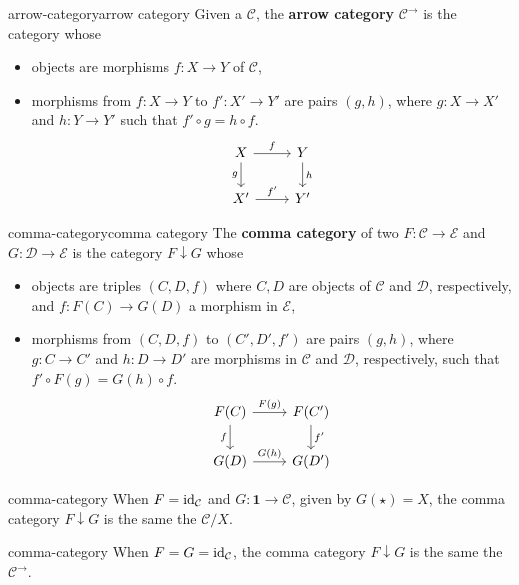 \begin{topic}{arrow-category}{arrow category}
    Given a  $\mathcal{C}$, the \textbf{arrow category} $\mathcal{C}^\rightarrow$ is the category whose
    \begin{itemize}
        \item objects are morphisms $f : X \to Y$ of $\mathcal{C}$,
        \item morphisms from $f : X \to Y$ to $f' : X' \to Y'$ are pairs $(g, h)$, where $g : X \to X'$ and $h : Y \to Y'$ such that $f' \circ g = h \circ f$.
        \[ \begin{tikzcd} X \arrow{r}{f} \arrow[swap]{d}{g} & Y \arrow{d}{h} \\ X' \arrow{r}{f'} & Y' \end{tikzcd} \]
    \end{itemize}
\end{topic}

\begin{topic}{comma-category}{comma category}
    The \textbf{comma category} of two  $F : \mathcal{C} \to \mathcal{E}$ and $G : \mathcal{D} \to \mathcal{E}$ is the category $F \downarrow G$ whose
    \begin{itemize}
        \item objects are triples $(C, D, f)$ where $C, D$ are objects of $\mathcal{C}$ and $\mathcal{D}$, respectively, and $f : F(C) \to G(D)$ a morphism in $\mathcal{E}$,
        \item morphisms from $(C, D, f)$ to $(C', D', f')$ are pairs $(g, h)$, where $g : C \to C'$ and $h : D \to D'$ are morphisms in $\mathcal{C}$ and $\mathcal{D}$, respectively, such that $f' \circ F(g) = G(h) \circ f$.
        \[ \begin{tikzcd}
            F(C) \arrow{r}{F(g)} \arrow[swap]{d}{f} & F(C') \arrow{d}{f'} \\ G(D) \arrow{r}{G(h)} & G(D')
        \end{tikzcd} \]
    \end{itemize}
\end{topic}

\begin{example}{comma-category}
    When $F = \text{id}_\mathcal{C}$ and $G : \textbf{1} \to \mathcal{C}$, given by $G(\star) = X$, the comma category $F \downarrow G$ is the same the  $\mathcal{C}/X$.
\end{example}

\begin{example}{comma-category}
    When $F = G = \text{id}_\mathcal{C}$, the comma category $F \downarrow G$ is the same the  $\mathcal{C}^\rightarrow$.
\end{example}

